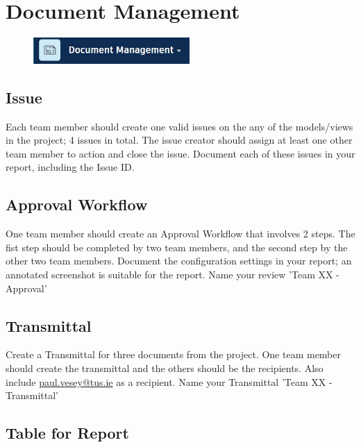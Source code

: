 \newpage

\section{Document Management}

\begin{figure}[h!t]
	\includegraphics[height=1.0cm]{RevitAssets/docmgmt}
	\label{fig:docmgmt}
\end{figure}


\subsection{Issue}

Each team member should create one valid issues on the any of the models/views in the project; 4 issues in total.  The issue creator should assign at least one other team member to action and close the issue.  Document each of these issues in your report, including the Issue ID.

\subsection{Approval Workflow}

One team member should create an Approval Workflow that involves 2 steps.  The fist step should be completed by two team members, and the second step by the other two team members.  Document the configuration settings in your report; an annotated screenshot is suitable for the report.  Name your review 'Team XX - Approval'  

\subsection{Transmittal}

Create a Transmittal for three documents from the project.  One team member should create the transmittal and the others should be the recipients.  Also include \href{mailto:paul.vesey@tus.ie}{paul.vesey@tus.ie} as a recipient.  Name your Transmittal 'Team XX - Transmittal'

\subsection{Table for Report}

